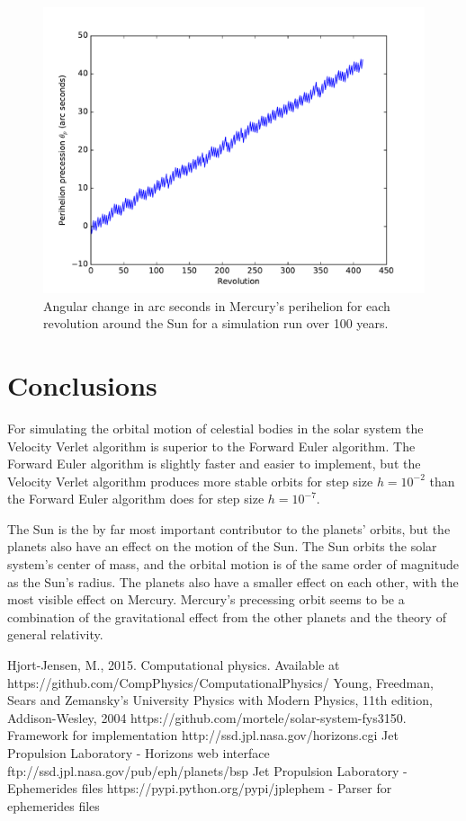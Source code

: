 \documentclass{article}
\begin{document}
\begin{figure}
\centering
\includegraphics[width=0.8\linewidth]{fig/Perihelion_Precession.pdf}
\caption{Angular change in arc seconds in Mercury's perihelion for each revolution around the Sun for a simulation run over 100 years.}
\label{fig:peri}
\end{figure}

\section{Conclusions}
\label{sec:conclusions}
For simulating the orbital motion of celestial bodies in the solar system the Velocity Verlet algorithm is superior to the Forward Euler algorithm. The Forward Euler algorithm is slightly faster and easier to implement, but the Velocity Verlet algorithm produces more stable orbits for step size $h=10^{-2}$ than the Forward Euler algorithm does for step size $h=10^{-7}$.

The Sun is the by far most important contributor to the planets' orbits, but the planets also have an effect on the motion of the Sun. The Sun orbits the solar system's center of mass, and the orbital motion is of the same order of magnitude as the Sun's radius. The planets also have a smaller effect on each other, with the most visible effect on Mercury. Mercury's precessing orbit seems to be a combination of the gravitational effect from the other planets and the theory of general relativity.


\clearpage

\begin{thebibliography}{1}
 Hjort-Jensen, M., 2015. Computational physics. Available at https://github.com/CompPhysics/ComputationalPhysics/
 Young, Freedman, Sears and Zemansky's University Physics with Modern Physics, 11th edition, Addison-Wesley, 2004  
 https://github.com/mortele/solar-system-fys3150. Framework for implementation
 http://ssd.jpl.nasa.gov/horizons.cgi Jet Propulsion Laboratory - Horizons web interface
 ftp://ssd.jpl.nasa.gov/pub/eph/planets/bsp Jet Propulsion Laboratory - Ephemerides files
 https://pypi.python.org/pypi/jplephem - Parser for ephemerides files
\end{thebibliography}
\end{document}
